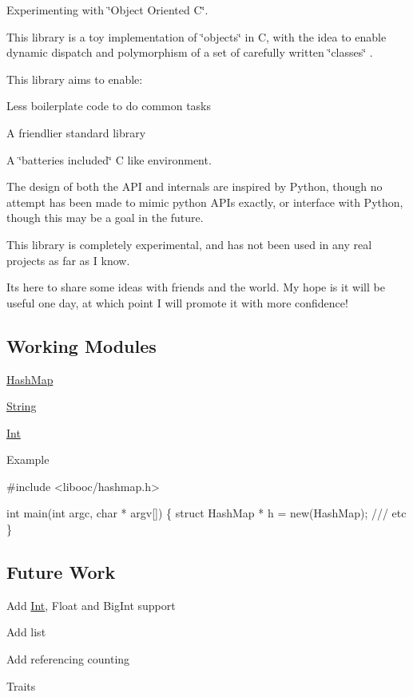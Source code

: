 Experimenting with \char`\"{}\+Object Oriented C\char`\"{}.

This library is a toy implementation of \char`\"{}objects\char`\"{} in C, with the idea to enable dynamic dispatch and polymorphism of a set of carefully written \char`\"{}classes\char`\"{} .

This library aims to enable\+:
\begin{DoxyItemize}
\item Less boilerplate code to do common tasks
\item A friendlier standard library
\item A \char`\"{}batteries included\char`\"{} C like environment.
\end{DoxyItemize}

The design of both the A\+PI and internals are inspired by Python, though no attempt has been made to mimic python A\+P\+Is exactly, or interface with Python, though this may be a goal in the future.

This library is completely experimental, and has not been used in any real projects as far as I know.

It\textquotesingle{}s here to share some ideas with friends and the world. My hope is it will be useful one day, at which point I will promote it with more confidence!

\subsection*{Working Modules}


\begin{DoxyItemize}
\item \mbox{\hyperlink{structHashMap}{Hash\+Map}}
\item \mbox{\hyperlink{structString}{String}}
\item \mbox{\hyperlink{structInt}{Int}}
\end{DoxyItemize}

Example 
\begin{DoxyCode}
#include <libooc/hashmap.h>

int main(int argc, char * argv[]) \{
    struct HashMap * h = new(HashMap);
    /// etc
\}
\end{DoxyCode}


\subsection*{Future Work}


\begin{DoxyItemize}
\item Add \mbox{\hyperlink{structInt}{Int}}, Float and Big\+Int support
\item Add list
\item Add referencing counting
\item Traits 
\end{DoxyItemize}